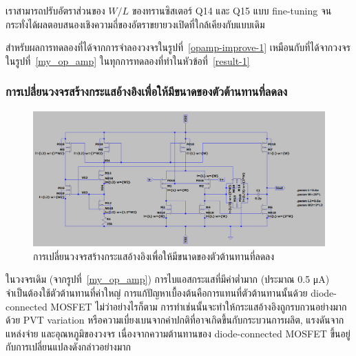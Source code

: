 \documentclass[a4paper, 11pt, oneside]{book} %
\begin{document}
เราสามารถปรับอัตราส่วนของ $W/L$ ของทรานซิสเตอร์ Q14 และ Q15 แบบ fine-tuning จนกระทั่งได้ผลตอบสนองเชิงความถี่ของอัตราขยายวงเปิดที่ใกล้เคียงกับแบบเดิม 

สำหรับผลการทดลองที่ได้จากการจำลองวงจรในรูปที่~\ref{opamp-improve-1} เหมือนกับที่ได้จากวงจรในรูปที่~\ref{my_op_amp} ในทุกการทดลองที่ทำในหัวข้อที่~\ref{result-1}

\subsubsection{การเปลี่ยนวงจรสร้างกระแสอ้างอิงเพื่อให้มีขนาดของตัวต้านทานที่ลดลง}

\begin{figure}[h]
    \centering
    \includegraphics[width = \linewidth]{opamp-improve-2}
    \caption{การเปลี่ยนวงจรสร้างกระแสอ้างอิงเพื่อให้มีขนาดของตัวต้านทานที่ลดลง}
    \label{opamp-improve-2}
\end{figure}

ในวงจรเดิม (จากรูปที่~\ref{my_op_amp}) การไบแอสกระแสที่มีค่าต่ำมาก (ประมาณ 0.5 \si{\micro A}) จำเป็นต้องใช้ตัวต้านทานที่ค่าใหญ่ การแก้ปัญหาเบื้องต้นคือการแทนที่ตัวต้านทานนั้นด้วย diode-connected MOSFET ไม่ว่าอย่างไรก็ตาม การทำเช่นนั้นจะทำให้กระแสอ้างอิงถูกรบกวนอย่างมากด้วย PVT variation หรือความเบี่ยงเบนจากค่าปกติที่อาจเกิดขึ้นกับกระบวนการผลิต, แรงดันจากแหล่งจ่าย และอุณหภูมิของวงจร เนื่องจากความต้านทานของ diode-connected MOSFET ขึ้นอยู่กับการเปลี่ยนแปลงดังกล่าวอย่างมาก
\end{document}
